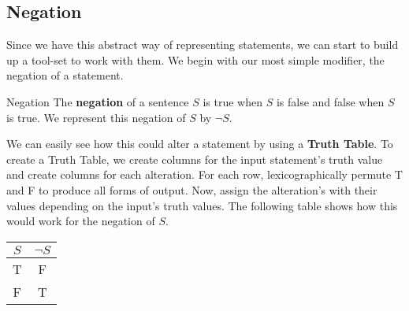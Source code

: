 \subsection{Negation}

Since we have this abstract way of representing statements, we can start to build up a tool-set to work with them.
We begin with our most simple modifier, the negation of a statement.

\begin{defn}{Negation}
  The \textbf{negation} of a sentence $S$ is true when $S$ is false and false when $S$ is true.
  We represent this negation of $S$ by $\neg S$.
\end{defn}


We can easily see how this could alter a statement by using a \textbf{Truth Table}.
To create a Truth Table, we create columns for the input statement's truth value and create columns for each alteration.
For each row, lexicographically permute T and F to produce all forms of output.
Now, assign the alteration's with their values depending on the input's truth values.
The following table shows how this would work for the negation of $S$.

\begin{minipage}{\linewidth}
  \centering
  \begin{tabular}{cc}
    $S$ & $\neg S$ \\
    \toprule
    T & F \\
    F & T \\
  \end{tabular}
  \label{tab:negation} 
\end{minipage}


